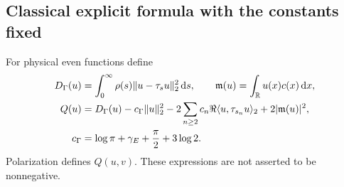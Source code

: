 \documentclass[11pt,a4paper]{article}
\newcommand{\R}{\mathbb R}
\newcommand{\ip}[2]{\langle #1,#2\rangle}
\newcommand{\norm}[1]{\lVert #1\rVert}
\newcommand{\abs}[1]{\lvert #1\rvert}
\newcommand{\dd}{\,\mathrm d}
\theoremstyle{definition}
\theoremstyle{remark}
\numberwithin{equation}{section}
\begin{document}
\subsection{Classical explicit formula with the constants fixed}
For physical even functions define
\begin{align}\label{eq:Q}
 D_\Gamma(u)&=\int_0^\infty\rho(s)\norm{u-\tau_su}_2^2\dd s,
 \qquad \mathfrak m(u)=\int_\R u(x)c(x)\dd x,\notag\\
 Q(u)&=D_\Gamma(u)-c_\Gamma\norm u_2^2
       -2\sum_{n\ge2}c_n\Re\ip u{\tau_{s_n}u}_2
       +2\abs{\mathfrak m(u)}^2,\notag\\
 c_\Gamma&=\log\pi+\gamma_E+\frac\pi2+3\log2.
\end{align}
Polarization defines $Q(u,v)$. These expressions are not asserted to be
nonnegative.
\end{document}
